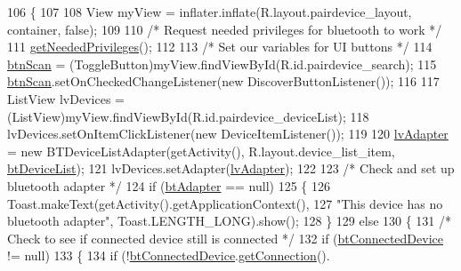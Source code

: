 \begin{DoxyCode}
106                                                                                                       \{
107 
108         View myView = inflater.inflate(R.layout.pairdevice\_layout, container, \textcolor{keyword}{false});
109 
110         \textcolor{comment}{/* Request needed privileges for bluetooth to work */}
111         \hyperlink{class_android_app_1_1_pair_device_fragment_ac6569d8f68c8023f2c2d38da55260f29}{getNeededPrivileges}();
112 
113         \textcolor{comment}{/* Set our variables for UI buttons */}
114         \hyperlink{class_android_app_1_1_pair_device_fragment_ada62059f31e97361bd94f2828cdc44e1}{btnScan} = (ToggleButton)myView.findViewById(R.id.pairdevice\_search);
115         \hyperlink{class_android_app_1_1_pair_device_fragment_ada62059f31e97361bd94f2828cdc44e1}{btnScan}.setOnCheckedChangeListener(\textcolor{keyword}{new} DiscoverButtonListener());
116 
117         ListView lvDevices = (ListView)myView.findViewById(R.id.pairdevice\_deviceList);
118         lvDevices.setOnItemClickListener(\textcolor{keyword}{new} DeviceItemListener());
119 
120         \hyperlink{class_android_app_1_1_pair_device_fragment_a27eee15fc9f4328366bba7e795e026ac}{lvAdapter} = \textcolor{keyword}{new} BTDeviceListAdapter(getActivity(), R.layout.device\_list\_item, 
      \hyperlink{class_android_app_1_1_pair_device_fragment_ac375aedac2d098332a1af1cf696f50a3}{btDeviceList});
121         lvDevices.setAdapter(\hyperlink{class_android_app_1_1_pair_device_fragment_a27eee15fc9f4328366bba7e795e026ac}{lvAdapter});
122 
123         \textcolor{comment}{/* Check and set up bluetooth adapter */}
124         \textcolor{keywordflow}{if} (\hyperlink{class_android_app_1_1_pair_device_fragment_a54c71cf078647dbcd55742fc31a0a191}{btAdapter} == null)
125         \{
126             Toast.makeText(getActivity().getApplicationContext(),
127                     \textcolor{stringliteral}{"This device has no bluetooth adapter"}, Toast.LENGTH\_LONG).show();
128         \}
129         \textcolor{keywordflow}{else}
130         \{
131             \textcolor{comment}{/* Check to see if connected device still is connected */}
132             \textcolor{keywordflow}{if} (\hyperlink{class_android_app_1_1_pair_device_fragment_ac3d93a383672355ed54c56dc3e21e827}{btConnectedDevice} != null)
133             \{
134                 \textcolor{keywordflow}{if} (!\hyperlink{class_android_app_1_1_pair_device_fragment_ac3d93a383672355ed54c56dc3e21e827}{btConnectedDevice}.\hyperlink{class_android_app_1_1_b_t_device_item_af256e53bf23dd3f969b14e0566a7b785}{getConnection}().

\end{DoxyCode}
